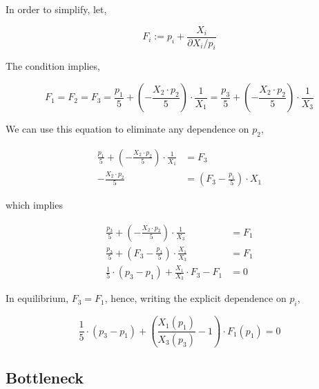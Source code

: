 In order to simplify, let,

\begin{equation}
    F_i := p_i +  \frac{X_i}{\partial X_i / p_i}
\end{equation}

The condition implies,

\begin{equation}
    F_1 = F_2 = F_3 = \frac{p_1}{5} + \left(- \frac{X_2 \cdot p_2}{5} \right) \cdot \frac{1}{X_1} = \frac{p_3}{5} + \left(- \frac{X_2 \cdot p_2}{5} \right) \cdot \frac{1}{X_3}
\end{equation}

We can use this equation to eliminate any dependence on $p_2$,

\begin{equation}
    \begin{split}
        \frac{p_1}{5} + \left(- \frac{X_2 \cdot p_2}{5} \right) \cdot \frac{1}{X_1} &= F_3 \\
        - \frac{X_2 \cdot p_2}{5} &= \left( F_3 - \frac{p_1}{5} \right) \cdot X_1
    \end{split}
\end{equation}

which implies

\begin{equation}
    \begin{split}
        \frac{p_3}{5} + \left(- \frac{X_2 \cdot p_2}{5} \right) \cdot \frac{1}{X_3} &= F_1 \\
        \frac{p_3}{5} + \left( F_3 - \frac{p_1}{5} \right) \cdot \frac{X_1}{X_3} &= F_1 \\
        \frac{1}{5} \cdot (p_3 - p_1) + \frac{X_1}{X_3} \cdot F_3 - F_1 &= 0
    \end{split}
\end{equation}

In equilibrium, $F_3 = F_1$, hence, writing the explicit dependence on $p_i$,

\begin{equation}
    \frac{1}{5} \cdot (p_3 - p_1) + \left( \frac{X_1(p_1)}{X_3(p_3)} - 1 \right) \cdot F_1(p_1)= 0
\end{equation}

\subsection{Bottleneck}


\vspace{0.5cm}

